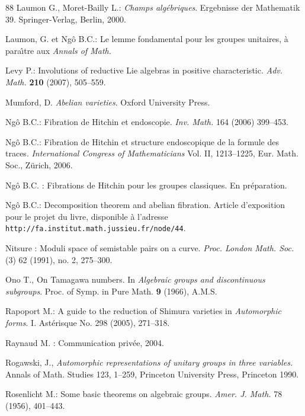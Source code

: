 \documentclass[12pt,english]{smfart}
\numberwithin{equation}{subsection}
\theoremstyle{remark}
\begin{document}
\begin{thebibliography}{88}
 Laumon G., Moret-Bailly L.: {\em Champs alg\'ebriques}.
    Ergebnisse der Mathematik  39. Springer-Verlag, Berlin, 2000.

 Laumon, G. et Ng\^o B.C.: {Le lemme fondamental pour les
    groupes unitaires}, \`a para{\^\i}tre aux {\em Annals of Math.}

 Levy P.: {Involutions of reductive Lie algebras in positive characteristic}.
    {\em Adv. Math.} {\bf 210} (2007), 505--559.

 Mumford, D. {\em Abelian varieties}.
   Oxford University Press.

 Ng\^o B.C.: {Fibration de Hitchin et endoscopie}.
{\em Inv. Math.} 164 (2006) 399--453.

 Ng\^o B.C.: {Fibration de Hitchin et structure endoscopique
    de la formule des traces}.  {\em International Congress of Mathematicians} Vol.
    II,  1213--1225, Eur. Math. Soc., Z\"{u}rich, 2006.

 Ng\^o B.C. : {Fibrations de Hitchin pour les groupes
    classiques}. En pr\'eparation.

 Ng\^o B.C.: {Decomposition theorem and abelian fibration}.
    Article d'exposition pour le projet du livre, disponible \`a l'adresse
    \texttt{http://fa.institut.math.jussieu.fr/node/44}.

 Nitsure : {Moduli space of semistable pairs on a curve}. {\em
    Proc.   London Math. Soc.} (3)  62  (1991),  no. 2, 275--300.

 Ono T., {On Tamagawa numbers}. In \emph{Algebraic groups
and discontinuous subgroups}. Proc. of Symp. in Pure Math.
\textbf{9} (1966), A.M.S.

 Rapoport M.: {A guide to the reduction of Shimura varieties} in
    {\em Automorphic forms}. I.  Ast\'erisque  No. 298 (2005), 271--318.

 Raynaud M. : {Communication priv\'ee}, 2004.

 Rogawski, J., \emph{Automorphic representations of unitary
groups in three variables.} Annals of Math. Studies 123,
 1--259, Princeton University Press, Princeton 1990.

 Rosenlicht M.: Some basic theorems on algebraic groups.
{\em Amer. J. Math.} 78 (1956), 401--443.


\end{thebibliography}
\end{document}
